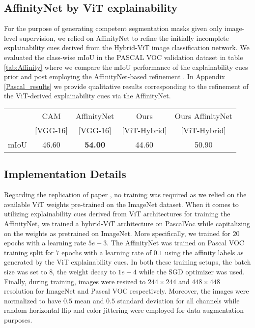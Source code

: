 \subsection{AffinityNet by ViT explainability}
For the purpose of generating competent segmentation masks given only image-level supervision, we relied on AffinityNet to refine the initially incomplete explainability cues derived from the Hybrid-ViT image classification network. We evaluated the class-wise mIoU in the PASCAL VOC validation dataset in table \ref{tab:Affinity} where we compare the mIoU performance of the explainability cues prior and post employing the AffinityNet-based refinement \cite{ahn2018learning}. In Appendix \ref{Pascal_results} we provide qualitative results corresponding to the refinement of the ViT-derived explainability cues via the AffinityNet.


\begin{table*}[!h]
    \begin{tabular*}{\linewidth}{@{\extracolsep{\fill}}lcccc}
        \toprule
        &CAM \cite{zhou2016learning} & AffinityNet \cite{ahn2018learning} & Ours & Ours AffinityNet \\
        &[VGG-16] & [VGG-16] & [ViT-Hybrid] & [ViT-Hybrid] \\  

        
        \midrule
        mIoU & 46.60 & \textbf{54.00} & 44.60 & 50.90\\
        \bottomrule
    \end{tabular*}
    \caption{Segmentation performance on the Pascal VOC segmentation \cite{Everingham15} dataset (percent). Higher is better.}
    \label{tab:Affinity}
\end{table*}


\subsection{Implementation Details}
Regarding the replication of paper \cite{mainpaper}, no training was required as we relied on the available ViT weights pre-trained on the ImageNet dataset. When it comes to utilizing explainability cues derived from ViT architectures for training the AffinityNet, we trained a hybrid-ViT architecture on PascalVoc while capitalizing on the weights as pretrained on ImageNet. More specifically, we trained for $20$ epochs with a learning rate $5e-3$. The AffinityNet was trained on Pascal VOC training split for $7$ epochs with a learning rate of $0.1$ using the affinity labels as generated by the ViT explainability cues. In both these training setups, the batch size was set to $8$, the weight decay to $1e-4$ while the SGD optimizer was used. Finally, during training, images were resized to $244\times244$ and $448\times448$ resolution for ImageNet and Pascal VOC respectively. Moreover, the images were normalized to have $0.5$ mean and $0.5$ standard deviation for all channels while  random horizontal flip and color jittering were employed for data augmentation purposes.


